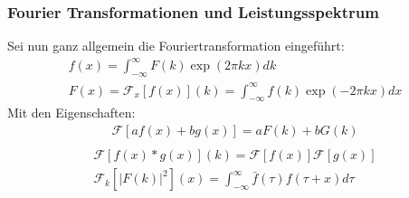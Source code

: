 \subsubsection{Fourier Transformationen und Leistungsspektrum}
Sei nun ganz allgemein die Fouriertransformation eingeführt:
\begin{align}
f(x) = \int_{-\infty}^{\infty} F(k)\exp(2\pi kx)dk\\
F(x) = \mathcal{F}_x\left [f(x)\right ](k) =
\int_{-\infty}^{\infty} f(k)\exp(-2\pi kx)dx
\end{align}
Mit den Eigenschaften:
\begin{align}
\mathcal{F}\left [a f(x) + b g(x)\right ]
    = a F(k) + b G(k)\\ 

\end{align}
\begin{align}
\mathcal{F}\left [f(x) * g(x)\right ](k)
    = \mathcal{F}\left [f(x)\right ]\mathcal{F}\left [g(x)\right ]\\
\mathcal{F}_k\left [\left | F(k) \right |^2\right ](x)
   =  \int_{-\infty}^{\infty}\bar{f}(\tau)f(\tau + x) d\tau 
\end{align}
